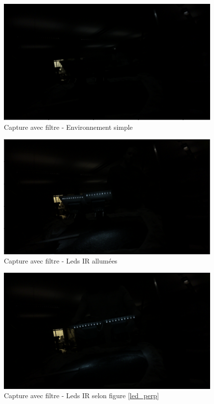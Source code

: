 \begin{figure}[H]
    \centering
    \includegraphics[width=13cm]{assets/figures/filtre_simple.png}
    \caption{Capture avec filtre - Environnement simple}
\end{figure}
\begin{figure}[H]
    \centering
    \includegraphics[width=13cm]{assets/figures/filtre_IR.png}
    \caption{Capture avec filtre - Leds IR allumées}
\end{figure}
\newpage
\begin{figure}[H]
    \centering
    \includegraphics[width=13cm]{assets/figures/filtre_IR_huile.png}
    \caption{Capture avec filtre - Leds IR selon figure \ref{led_perp}}
\end{figure}
